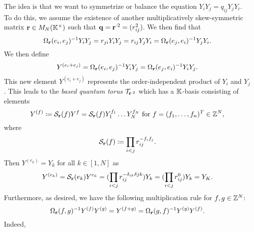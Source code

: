 The idea is that we want to symmetrize or balance the equation $Y_i Y_j = q_{ij} Y_j
	Y_i$. To do this, we assume the existence of another multiplicatively skew-symmetric
matrix $\mathbf{r} \in M_N(\mathbb{K}^\times)$ such that $\mathbf{q} = \mathbf{r}^{\cdot 2} = (r_{ij}^2)$. We
then find that
\begin{equation*}
	\Omega_{\mathbf{r}}(e_i, e_j)^{-1} Y_i Y_j = r_{ji} Y_i Y_j = r_{ij} Y_j Y_i = \Omega_{\mathbf{r}} (e_j, e_i)^{-1} Y_j Y_i.
\end{equation*}
%
We then define
\begin{equation*}
	Y^{(e_i + e_j)} = \Omega_{\mathbf{r}}(e_i, e_j)^{-1} Y_i Y_j = \Omega_{\mathbf{r}}(e_j, e_i)^{-1} Y_i Y_j.
\end{equation*}
%
This new element $Y^{(e_i + e_j)}$ represents the order-independent product of $Y_i$
and $Y_j$. This leads to the \emph{based quantum torus}
$\mathcal{T}_{\mathbf{r}^{\cdot 2}}$ which has a $\mathbb{K}$-basis consisting of elements
\begin{equation*}
	Y^{(f)} \coloneq \mathcal{S}_{\mathbf{r}}(f)Y^f = \mathcal{S}_{\mathbf{r}}(f)Y_1^{f_1}\dots Y_N^{f_N}
	\text{ for } f = (f_1, \dots, f_n)^T \in \mathbb{Z}^N,
\end{equation*}
where
\begin{equation*}
	\mathcal{S}_{\mathbf{r}}(f) \coloneq \prod_{i < j}r_{ij}^{-f_if_j}.
\end{equation*}
Then $Y^{(e_k)} = Y_k$ for all $k \in [1, N]$ as
\begin{align*}
	Y^{(e_k)}
	= \mathcal{S}_{\mathbf{r}}(e_k)Y^{e_k}
	= (\prod_{i < j}r_{ij}^{-\delta_{ik}\delta{jk}} )Y_k
	= (\prod_{i < j}r_{ij}^0 )Y_k
	= Y_K.
\end{align*}
Furthermore, as desired, we have the following multiplication rule for $f,g \in \mathbb{Z}^N$:
\begin{equation*}
	\Omega_{\mathbf{r}}(f,g)^{-1} Y^{(f)}Y^{(g)} = Y^{(f+g)} = \Omega_{\mathbf{r}} (g, f)^{-1} Y^{(g)}Y^{(f)}.
\end{equation*}
Indeed,
